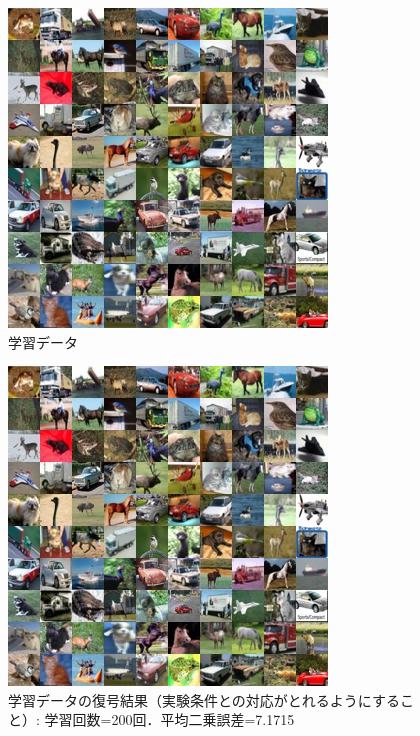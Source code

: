 \documentclass[12pt]{jsarticle}
\begin{document}
\begin{figure}[tb]
\begin{center}
\includegraphics[width=\linewidth]{cyfer_ans.jpg}
\caption{学習データ} \label{fig:ae1}
\end{center}
\end{figure}

\begin{figure}[tb]
\begin{center}
\includegraphics[width=\linewidth]{cyfer_ans.jpg}
\caption{学習データの復号結果（実験条件との対応がとれるようにすること）: 学習回数=200回．平均二乗誤差=7.1715} \label{fig:ae}
\end{center}
\end{figure}
\end{document}
